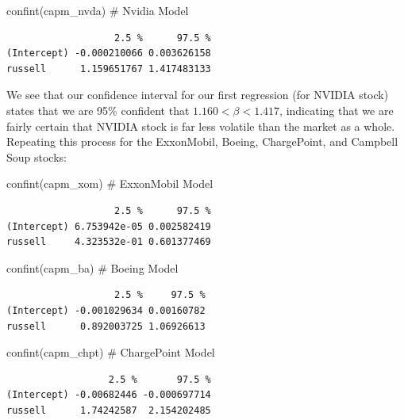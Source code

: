 \documentclass[
  letterpaper,
]{book}
\newenvironment{Shaded}{\begin{snugshade}}{\end{snugshade}}
\newcommand{\CommentTok}[1]{\textcolor[rgb]{0.37,0.37,0.37}{#1}}
\newcommand{\FunctionTok}[1]{\textcolor[rgb]{0.28,0.35,0.67}{#1}}
\newcommand{\NormalTok}[1]{\textcolor[rgb]{0.00,0.23,0.31}{#1}}
\begin{document}
\begin{Shaded}
\begin{Highlighting}[]
\FunctionTok{confint}\NormalTok{(capm\_nvda) }\CommentTok{\# Nvidia Model}
\end{Highlighting}
\end{Shaded}

\begin{verbatim}
                   2.5 %      97.5 %
(Intercept) -0.000210066 0.003626158
russell      1.159651767 1.417483133
\end{verbatim}

We see that our confidence interval for our first regression (for NVIDIA
stock) states that we are 95\% confident that \(1.160<\beta<1.417\),
indicating that we are fairly certain that NVIDIA stock is far less
volatile than the market as a whole. Repeating this process for the
ExxonMobil, Boeing, ChargePoint, and Campbell Soup stocks:

\begin{Shaded}
\begin{Highlighting}[]
\FunctionTok{confint}\NormalTok{(capm\_xom) }\CommentTok{\# ExxonMobil Model}
\end{Highlighting}
\end{Shaded}

\begin{verbatim}
                   2.5 %      97.5 %
(Intercept) 6.753942e-05 0.002582419
russell     4.323532e-01 0.601377469
\end{verbatim}

\begin{Shaded}
\begin{Highlighting}[]
\FunctionTok{confint}\NormalTok{(capm\_ba) }\CommentTok{\# Boeing Model}
\end{Highlighting}
\end{Shaded}

\begin{verbatim}
                   2.5 %     97.5 %
(Intercept) -0.001029634 0.00160782
russell      0.892003725 1.06926613
\end{verbatim}

\begin{Shaded}
\begin{Highlighting}[]
\FunctionTok{confint}\NormalTok{(capm\_chpt) }\CommentTok{\# ChargePoint Model}
\end{Highlighting}
\end{Shaded}

\begin{verbatim}
                  2.5 %       97.5 %
(Intercept) -0.00682446 -0.000697714
russell      1.74242587  2.154202485
\end{verbatim}
\end{document}
